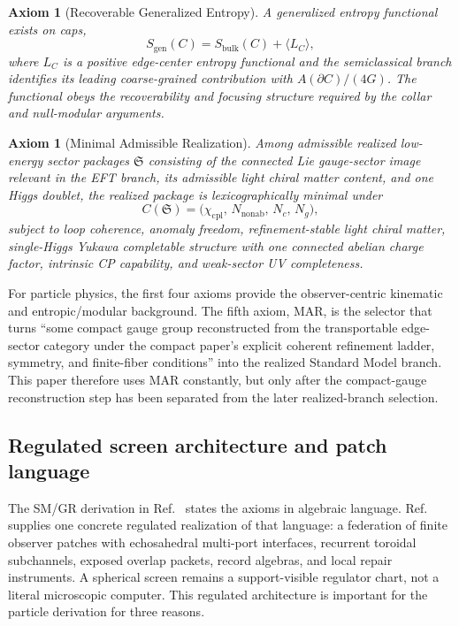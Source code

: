 \documentclass[11pt]{article}
\newtheorem{axiom}[theorem]{Axiom}
\begin{document}
\begin{axiom}[Recoverable Generalized Entropy]\label{ax:entropy}
A generalized entropy functional exists on caps,
\[
S_{\mathrm{gen}}(C)=S_{\mathrm{bulk}}(C)+\langle L_C\rangle,
\]
where \(L_C\) is a positive edge-center entropy functional and the semiclassical branch
identifies its leading coarse-grained contribution with \(A(\partial C)/(4G)\). The functional
obeys the recoverability and focusing structure required by the collar and null-modular
arguments.
\end{axiom}

\begin{axiom}[Minimal Admissible Realization]\label{ax:mar}
Among admissible realized low-energy sector packages \(\mathfrak S\) consisting of the connected
Lie gauge-sector image relevant in the EFT branch, its admissible light chiral matter content,
and one Higgs doublet, the realized package is lexicographically minimal under
\[
C(\mathfrak S)=\bigl(\chi_{\mathrm{cpl}},\,N_{\mathrm{nonab}},\,N_c,\,N_g\bigr),
\]
subject to loop coherence, anomaly freedom, refinement-stable light chiral matter,
single-Higgs Yukawa completable structure with one connected abelian charge factor, intrinsic
CP capability, and weak-sector UV completeness.
\end{axiom}

For particle physics, the first four axioms provide the observer-centric kinematic and
entropic/modular background. The fifth axiom, MAR, is the selector that turns ``some compact
gauge group reconstructed from the transportable edge-sector category under the compact paper's
explicit coherent refinement ladder, symmetry, and finite-fiber conditions'' into the realized Standard Model branch. This
paper therefore uses MAR constantly, but only after the compact-gauge reconstruction step has
been separated from the later realized-branch selection.

\subsection{Regulated screen architecture and patch language}

The SM/GR derivation in Ref.~\cite{ophcompact}
states the axioms in algebraic language. Ref.~\cite{ophmicrophysics} supplies one concrete
regulated realization of that language: a federation of finite observer patches with echosahedral
multi-port interfaces, recurrent toroidal subchannels, exposed overlap packets, record algebras,
and local repair instruments. A spherical screen remains a support-visible regulator chart, not a
literal microscopic computer. This regulated architecture is important for the particle derivation
for three reasons.
\end{document}
